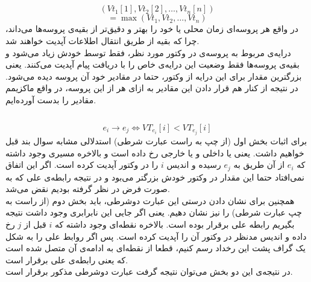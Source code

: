 \documentclass{article}
\begin{document}
\begin{multicols}{2}
\section{}
\subsection{}
$$(Vt_1[1], Vt_2[2], \dots, Vt_n[n]) $$
$$= \max(Vt_1, Vt_2, \dots, Vt_n)$$
در واقع هر پروسه‌ای زمان محلی یا
خود را بهتر و دقیق‌تر از بقیه‌ی پروسه‌ها می‌داند، چرا که بقیه از طریق انتقال اطلاعات آپدیت خواهند شد.\\
درایه‌ی مربوط به پروسه‌ی 
در وکتور مورد نظر، فقط توسط خودش زیاد می‌شود و بقیه‌ی پروسه‌ها فقط وضعیت این درایه‌ی خاص را با دریافت پیام آپدیت می‌کنند. یعنی بزرگترین مقدار برای این درایه از وکتور، حتما در مقادیر خود آن پروسه دیده می‌شود. در نتیجه از کنار هم قرار دادن این مقادیر به ازای هر
از این 
پروسه، در واقع ماکزیمم مقادیر را بدست آورده‌ایم.

\subsection{}
$$e_i \rightarrow e_j \Leftrightarrow VT_{e_i}[i] < VT_{e_j}[i]$$
برای اثبات بخش اول (از چپ به راست عبارت شرطی) استدلالی مشابه سوال بند قبل خواهیم داشت. یعنی یا
داخلی و یا خارجی رخ داده است و بالاخره مسیری وجود داشته که 
$e_i$
از آن طریق به
$e_j$
رسیده و اندیس
$i$
را در وکتور آپدیت کرده است. اگر این اتفاق نمی‌افتاد حتما این مقدار در وکتور خودش بزرگتر می‌بود و در نتیجه رابطه‌ی علی که به صورت فرض در نظر گرفته بودیم نقض می‌شد.\\
همچنین برای نشان دادن درستی این عبارت دوشرطی، باید بخش دوم (از راست به چپ عبارت شرطی) را نیز نشان دهیم. یعنی اگر جایی این نابرابری وجود داشت نتیجه بگیریم رابطه علی برقرار بوده است. بالاخره نقطه‌ای وجود داشته که
$i$
قبل از
$j$
رخ داده و اندیس مدنظر در وکتور آن را آپدیت کرده است. پس اگر روابط علی را به شکل یک گراف پشت این رخداد رسم کنیم، قطعا از نقطه‌ای به ادامه‌ی آن متصل شده است که یعنی رابطه‌ی علی برقرار است.\\
در نتیجه‌ی این دو بخش می‌توان نتیجه گرفت عبارت دوشرطی مذکور برقرار است.


\end{multicols}
\end{document}
